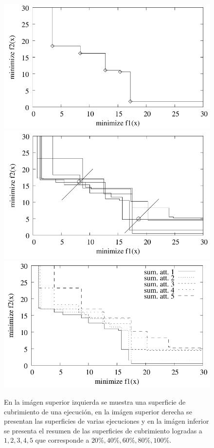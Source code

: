 \begin{figure}[H]
\centering
\scriptsize
\includegraphics[scale=0.2]
{Figures_Chapter2/Surface.png}
\includegraphics[scale=0.2]
{Figures_Chapter2/Surfaces.png}
\includegraphics[scale=0.2]
{Figures_Chapter2/AttainmentSurfaces.png}
\decoRule
\caption{En la imágen superior izquierda se muestra una superficie de cubrimiento de una ejecución, en la imágen superior derecha se presentan las superficies de varias ejecuciones y en la imágen inferior se presenta el resumen de las superficies de cubrimiento logradas a $1, 2, 3, 4, 5$ que corresponde a $20\%, 40\%, 60\%, 80\%, 100\% $.}
\label{fig:AttainmentSurfaces}
\end{figure}

